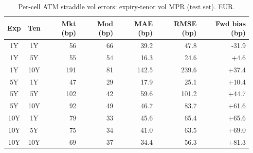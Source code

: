 \begin{table}[H]
\centering
\caption{Per-cell ATM straddle vol errors: expiry-tenor vol MPR (test set). EUR.}
\label{tab:expiry_tenor_vol_mpr_per_cell_test}
\small
\begin{tabular}{@{}ccrrrrr@{}}
\toprule
\textbf{Exp} & \textbf{Ten} & \textbf{Mkt (bp)} & \textbf{Mod (bp)} & \textbf{MAE (bp)} & \textbf{RMSE (bp)} & \textbf{Fwd bias (bp)} \\
\midrule
  1Y & 1Y & 56 & 66 & 39.2 & 47.8 & -31.9 \\
  1Y & 5Y & 55 & 54 & 16.3 & 24.6 & +4.6 \\
  1Y & 10Y & 191 & 81 & 142.5 & 239.6 & +37.4 \\
  \midrule
  5Y & 1Y & 47 & 29 & 17.9 & 25.1 & +10.4 \\
  5Y & 5Y & 102 & 42 & 59.6 & 101.2 & +44.7 \\
  5Y & 10Y & 92 & 49 & 46.7 & 83.7 & +61.6 \\
  \midrule
  10Y & 1Y & 79 & 33 & 45.6 & 65.4 & +65.6 \\
  10Y & 5Y & 75 & 34 & 41.0 & 63.5 & +69.0 \\
  10Y & 10Y & 69 & 37 & 34.4 & 56.3 & +81.3 \\
\bottomrule
\end{tabular}
\end{table}